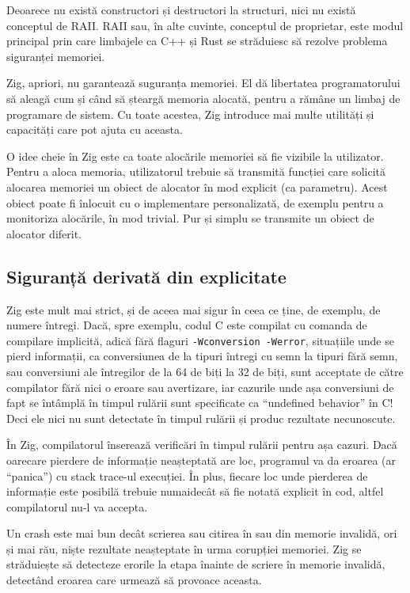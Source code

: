 \documentclass[a4paper,12pt]{report}
\begin{document}
Deoarece nu există constructori și destructori la structuri,
nici nu există conceptul de \ac{RAII}.
\ac{RAII} sau, în alte cuvinte, conceptul de proprietar, este modul principal
prin care limbajele ca C++ și Rust se străduiesc să rezolve problema siguranței memoriei.

Zig, apriori, nu garantează suguranța memoriei.
El dă libertatea programatorului să aleagă cum și când să șteargă memoria alocată,
pentru a rămâne un limbaj de programare de sistem.
Cu toate acestea, Zig introduce mai multe utilități și capacități care pot ajuta cu aceasta.

O idee cheie în Zig este ca toate alocările memoriei să fie vizibile la utilizator.
Pentru a aloca memoria, utilizatorul trebuie să transmită funcției care solicită alocarea memoriei
un obiect de alocator în mod explicit (ca parametru).
Acest obiect poate fi înlocuit cu o implementare personalizată,
de exemplu pentru a monitoriza alocările, în mod trivial.
Pur și simplu se transmite un obiect de alocator diferit.


\subsection{Siguranță derivată din explicitate}

Zig este mult mai strict, și de aceea mai sigur în ceea ce ține, de exemplu, de numere întregi.
Dacă, spre exemplu, codul C este compilat cu comanda de compilare implicită,
adică fără flaguri \texttt{-Wconversion -Werror}, situațiile unde se pierd informații,
ca conversiunea de la tipuri întregi cu semn la tipuri fără semn, sau conversiuni ale întregilor
de la 64 de biți la 32 de biți, sunt acceptate de către compilator fără nici o eroare sau avertizare,
iar cazurile unde așa conversiuni de fapt se întâmplă în timpul rulării
sunt specificate ca ``undefined behavior'' în C!
Deci ele nici nu sunt detectate în timpul rulării și produc rezultate necunoscute.

În Zig, compilatorul înserează verificări în timpul rulării pentru așa cazuri.
Dacă oarecare pierdere de informație neașteptată are loc,
programul va da eroarea (ar ``panica'') cu stack trace-ul execuției.
În plus, fiecare loc unde pierderea de informație este posibilă trebuie numaidecât
să fie notată explicit în cod, altfel compilatorul nu-l va accepta.

Un crash este mai bun decât scrierea sau citirea în sau din memorie invalidă,
ori și mai rău, niște rezultate neașteptate în urma corupției memoriei.
Zig se străduiește să detecteze erorile la etapa înainte
de scriere în memorie invalidă, detectând eroarea care urmează să provoace aceasta.
\end{document}
